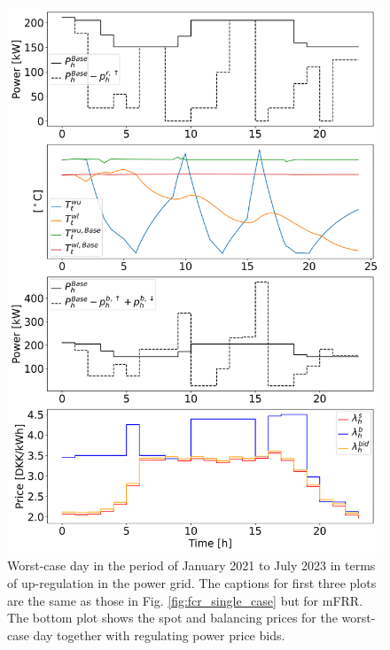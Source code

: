 \documentclass[conference]{IEEEtran}
\begin{document}
\begin{figure}[t]
    \centering
    \includegraphics[width=\columnwidth]{../figures/mfrr_single_case.png}
    \caption{\small{Worst-case day in the period of January 2021 to July 2023 in terms of up-regulation in the power grid. The captions for first three plots are the same as those in Fig. \ref{fig:fcr_single_case} but for mFRR. The bottom plot shows the spot and balancing prices for the worst-case day together with regulating power price bids. \vspace{-3mm}}}
    \label{fig:mfrr_single_case}
\end{figure}
\end{document}
